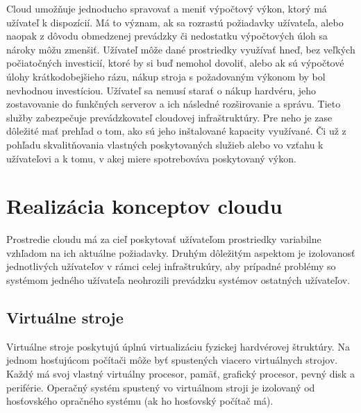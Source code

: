 \documentclass[printed,11pt,twoside,color,cover,table]{fithesis3}
\begin{document}
Cloud umožňuje jednoducho spravovať a meniť výpočtový výkon, ktorý má užívateľ k dispozícií. Má to význam, ak sa rozrastú požiadavky užívateľa, alebo naopak z dôvodu obmedzenej prevádzky či 
nedostatku výpočtových úloh sa nároky môžu zmenšiť. Užívateľ môže dané prostriedky využívať hneď, bez veľkých počiatočných investicií, ktoré by si buď nemohol dovoliť, alebo ak sú výpočtové úlohy 
krátkodobejšieho rázu, nákup stroja s požadovaným výkonom by bol nevhodnou investíciou. Užívateľ sa nemusí starať o nákup hardvéru, jeho zostavovanie do funkčných serverov a ich následné rozširovanie 
a správu. Tieto služby zabezpečuje prevádzkovateľ cloudovej infraštruktúry. Pre neho je zase dôležité mať prehľad o tom, ako sú jeho inštalované kapacity využívané. Či už z pohľadu skvalitňovania
vlastných poskytovaných služieb alebo vo vzťahu k užívateľovi a k tomu, v akej miere spotrebováva poskytovaný výkon.

\section{Realizácia konceptov cloudu}
Prostredie cloudu má za cieľ poskytovať užívateľom prostriedky variabilne vzhľadom na ich aktuálne požiadavky. Druhým dôležitým aspektom je
izolovanosť jednotlivých užívateľov v rámci celej infraštrukúry, aby prípadné problémy so systémom jedného užívateľa neohrozili prevádzku
systémov ostatných užívateľov.

\subsection{Virtuálne stroje}
Virtuálne stroje poskytujú úplnú virtualizáciu fyzickej hardvérovej štruktúry. Na jednom hosťujúcom počítači môže byť spustených viacero virtuálnych strojov. Každý má svoj vlastný virtuálny procesor, 
pamäť, grafický procesor, pevný disk a periférie. Operačný systém spustený vo virtuálnom stroji je izolovaný od hosťovského opračného systému (ak ho hosťovský počítač má). 
\end{document}
